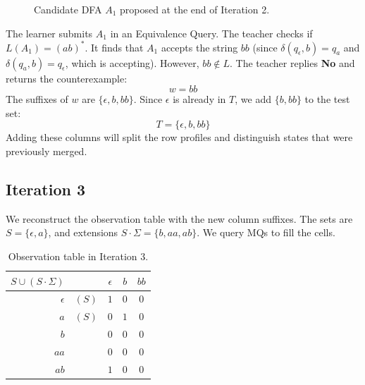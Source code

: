\begin{figure}[H]
  \centering
  \caption{Candidate DFA $A_1$ proposed at the end of Iteration 2.}
  \label{fig:dfa-iter2}
\end{figure}

The learner submits $A_1$ in an Equivalence Query. The teacher checks if $L(A_1) = (ab)^*$.
It finds that $A_1$ accepts the string $bb$ (since $\delta(q_\epsilon, b) = q_a$ and $\delta(q_a, b) = q_\epsilon$, which is accepting). However, $bb \notin L$. The teacher replies \textbf{No} and returns the counterexample:
\[
  w = bb
\]
The suffixes of $w$ are $\{\epsilon, b, bb\}$. Since $\epsilon$ is already in $T$, we add $\{b, bb\}$ to the test set:
\[
  T = \{\epsilon, b, bb\}
\]
Adding these columns will split the row profiles and distinguish states that were previously merged.

\subsection{Iteration 3}

We reconstruct the observation table with the new column suffixes. The sets are $S = \{\epsilon, a\}$, and extensions $S \cdot \Sigma = \{b, aa, ab\}$. We query MQs to fill the cells.

\begin{table}[H]
  \centering
  \begin{tabular}{rcccc}
    \toprule
    $S \cup (S \cdot \Sigma)$ & & $\epsilon$ & $b$ & $bb$ \\
    \midrule
    $\epsilon$ & $(S)$ & $1$ & $0$ & $0$ \\
    $a$ & $(S)$ & $0$ & $1$ & $0$ \\
    \midrule
    $b$ & & $0$ & $0$ & $0$ \\
    $aa$ & & $0$ & $0$ & $0$ \\
    $ab$ & & $1$ & $0$ & $0$ \\
    \bottomrule
  \end{tabular}
  \caption{Observation table in Iteration 3.}
  \label{tab:iter3}
\end{table}

